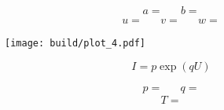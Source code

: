 \begin{align*}
	a =  && b = 
\end{align*}
\begin{align*}
	u =  && v =  && w = 
\end{align*}

\begin{figure}[H]
	\texttt{[image: build/plot\_4.pdf]}
	\caption{}
	\label{fig:plot_4}
\end{figure}

\begin{equation*}
	I = p \exp(qU)
\end{equation*}

\begin{align*}
	p =  && q = 
\end{align*}
\begin{equation*}
	T = 
\end{equation*}
